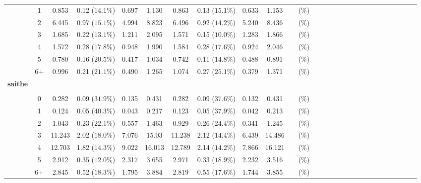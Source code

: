 \documentclass[a4paper 12pt]{article}
\numberwithin{equation}{section}
\begin{document}
\begin{tiny}
\begin{table}[h!]
\begin{tabular}{ccccccccccccccccccccccccccc}
\raisebox{1.5ex}{2018 Q1} & 1   & 0.853  & 0.12 ($14.1 \%$) & 0.697 & 1.130 & 0.863  & 0.13 ($15.1 \%$) &0.633 & 1.153 &  &  ($ \%$) \\[1ex]
& 2  & 6.445 & 0.97 ($15.1 \%$) & 4.994  & 8.823 & 6.496 & 0.92 ($14.2 \%$) &5.240 &8.436 & &  ($ \%$) \\[1ex]
& 3  & 1.685 & 0.22 ($13.1 \%$) & 1.211  & 2.095 & 1.571 & 0.15 ($10.0 \%$) &1.283 &1.866 & &  ($ \%$) \\[1ex]
& 4  &1.572  & 0.28 ($17.8 \%$) & 0.948  & 1.990 & 1.584 & 0.28 ($17.6 \%$) &0.924 &2.046 & &  ($ \%$) \\[1ex]
& 5  & 0.780 & 0.16 ($20.5 \%$) & 0.417  & 1.034 & 0.742 & 0.11 ($14.8 \%$) &0.488 &0.891 & &  ($ \%$) \\[1ex]
& 6+ & 0.996 & 0.21 ($21.1 \%$) & 0.490  & 1.265 & 1.074 & 0.27 ($25.1 \%$) &0.379 &1.371 & &  ($ \%$)\\[4.5ex]



{\bf saithe} \\[1.0ex]
\cmidrule(lr{0.1em}){1-1}\\[1.0ex]

\raisebox{1.5ex}{2017 Q3} & 0& 0.282 &0.09 ($31.9 \%$) & 0.135 & 0.431  & 0.282 &0.09 ($37.6 \%$) &0.132 &0.431 &  &  ($ \%$) \\[1ex]
 & 1 & 0.124  & 0.05 ($40.3 \%$) &0.043 &0.217  &0.123  &0.05   ($37.9 \%$) &0.042 &0.213 & &  ($ \%$) \\[1ex]
& 2  & 1.043  & 0.23 ($22.1 \%$) &0.557 & 1.463 &0.929  &0.26   ($24.4 \%$) &0.341 &1.245 & &  ($ \%$) \\[1ex]
& 3  & 11.243 & 2.02 ($18.0 \%$) &7.076 &15.03  &11.238 &2.12  ($14.4 \%$)  &6.439 &14.486 & &  ($ \%$) \\[1ex]
& 4  & 12.703 & 1.82 ($14.3 \%$) &9.022 &16.013 &12.789 &2.14 ($14.2 \%$)   &7.866 &16.121 & &  ($ \%$) \\[1ex]
& 5  & 2.912  & 0.35 ($12.0 \%$) &2.317 & 3.655 &2.971  &0.33  ($18.9 \%$)  &2.232 &3.516 & &  ($ \%$)\\[1ex]
& 6+ & 2.845  & 0.52 ($18.3 \%$) &1.795 & 3.884 &2.819  &0.55  ($17.6 \%$)  &1.744 &3.855 & &  ($ \%$)\\[3.5ex]


\end{tabular}
\end{table}
\end{tiny}
\end{document}
